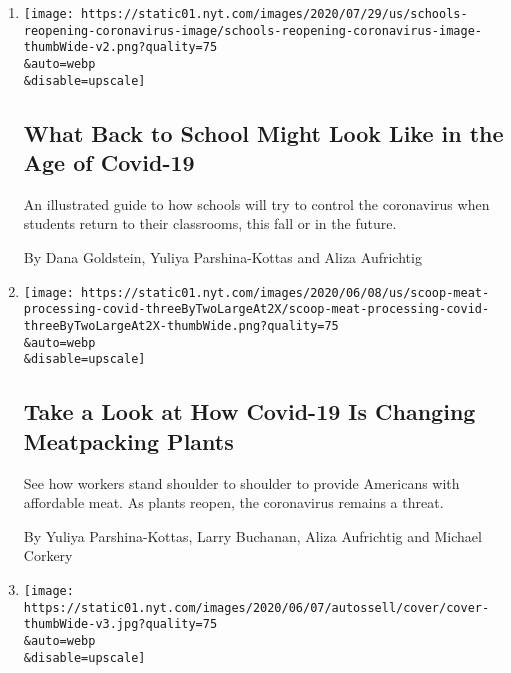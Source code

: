 \begin{enumerate}
\def\labelenumi{\arabic{enumi}.}
\item
  \href{/interactive/2020/07/29/us/schools-reopening-coronavirus.html}{}

  \texttt{[image: https://static01.nyt.com/images/2020/07/29/us/schools-reopening-coronavirus-image/schools-reopening-coronavirus-image-thumbWide-v2.png?quality=75\\\&auto=webp\\\&disable=upscale]}

  \hypertarget{what-back-to-school-might-look-like-in-the-age-of-covid-19}{%
  \subsection{What Back to School Might Look Like in the Age of
  Covid-19}\label{what-back-to-school-might-look-like-in-the-age-of-covid-19}}

  An illustrated guide to how schools will try to control the
  coronavirus when students return to their classrooms, this fall or in
  the future.

  By Dana Goldstein, Yuliya Parshina-Kottas and Aliza Aufrichtig
\item
  \href{/interactive/2020/06/08/us/meat-processing-plants-coronavirus.html}{}

  \texttt{[image: https://static01.nyt.com/images/2020/06/08/us/scoop-meat-processing-covid-threeByTwoLargeAt2X/scoop-meat-processing-covid-threeByTwoLargeAt2X-thumbWide.png?quality=75\\\&auto=webp\\\&disable=upscale]}

  \hypertarget{take-a-look-at-how-covid-19-is-changing-meatpacking-plants}{%
  \subsection{Take a Look at How Covid-19 Is Changing Meatpacking
  Plants}\label{take-a-look-at-how-covid-19-is-changing-meatpacking-plants}}

  See how workers stand shoulder to shoulder to provide Americans with
  affordable meat. As plants reopen, the coronavirus remains a threat.

  By Yuliya Parshina-Kottas, Larry Buchanan, Aliza Aufrichtig and
  Michael Corkery
\item
  \href{/interactive/2020/06/07/us/george-floyd-protest-aerial-photos.html}{}

  \texttt{[image: https://static01.nyt.com/images/2020/06/07/autossell/cover/cover-thumbWide-v3.jpg?quality=75\\\&auto=webp\\\&disable=upscale]}


\end{enumerate}
